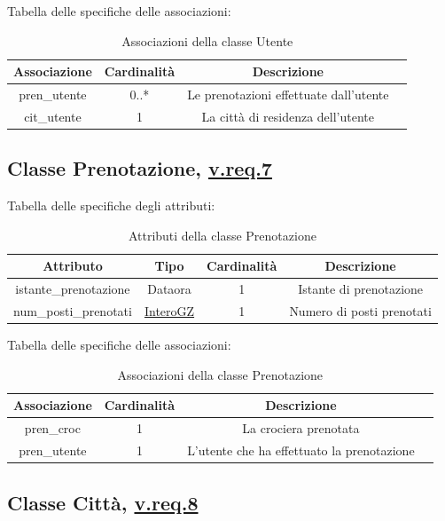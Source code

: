 \documentclass{article}
\begin{document}
Tabella delle specifiche delle associazioni:
\begin{table}[h!]
    \centering
    \begin{tabular}{|c|c|c|c|}
        \hline
        Associazione & Cardinalità & Descrizione \\
        \hline
        pren\_utente & 0..* & Le prenotazioni effettuate dall'utente \\
        cit\_utente & 1 & La città di residenza dell'utente \\
        \hline
    \end{tabular}
    \caption{Associazioni della classe Utente}
\end{table}
\subsection*{Classe Prenotazione, \hyperref[sec:RequisitiPrenotazione]{v.req.7}}\label{sec:Prenotazione}

Tabella delle specifiche degli attributi:
\begin{table}[h!]
    \centering
    \begin{tabular}{|c|c|c|c|}
        \hline
        Attributo & Tipo & Cardinalità & Descrizione \\
        \hline
        istante\_prenotazione & Dataora & 1 & Istante di prenotazione \\
        num\_posti\_prenotati & \hyperref[sec:InteroGZ]{InteroGZ} & 1 & Numero di posti prenotati \\
        \hline
    \end{tabular}
    \caption{Attributi della classe Prenotazione}
\end{table}

Tabella delle specifiche delle associazioni:
\begin{table}[h!]
    \centering
    \begin{tabular}{|c|c|c|c|}
        \hline
        Associazione & Cardinalità & Descrizione \\
        \hline
        pren\_croc & 1 & La crociera prenotata \\
        pren\_utente & 1 & L'utente che ha effettuato la prenotazione \\
        \hline
    \end{tabular}
    \caption{Associazioni della classe Prenotazione}
\end{table}

\subsection*{Classe Città, \hyperref[sec:RequisitiCittà]{v.req.8}}\label{sec:Città}
\end{document}
